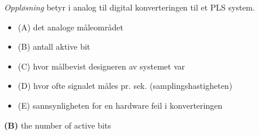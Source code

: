 


{\it Oppløsning} betyr \underbar{\hskip 50pt} i analog til digital konverteringen til et PLS system. 


\begin{itemize}
\item{(A)} det analoge måleområdet
\vskip 5pt 
\item{(B)} antall aktive bit
\vskip 5pt 
\item{(C)} hvor målbevist designeren av systemet var
\vskip 5pt 
\item{(D)} hvor ofte signalet måles pr. sek. (samplingshastigheten)
\vskip 5pt 
\item{(E)} sannsynligheten for en hardware feil i konverteringen 
\end{itemize}







{\bf (B)} the number of active bits
 










